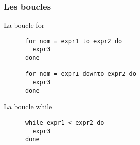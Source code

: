 \begin{frame}[fragile]
    \frametitle{Les boucles}
    \begin{block}{La boucle for}
	\begin{lstlisting}
	  for nom = expr1 to expr2 do
	    expr3
	  done

	  for nom = expr1 downto expr2 do
	    expr3
	  done
	\end{lstlisting}
      \end{block}
	\begin{block}{La boucle while}
	\begin{lstlisting}
	  while expr1 < expr2 do
	    expr3
	  done
      \end{lstlisting}
  \end{block}
\end{frame}
